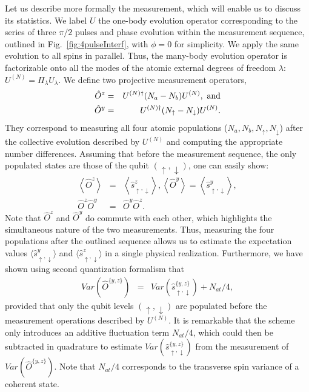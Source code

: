 Let us describe more formally the measurement, which will enable us to discuss its statistics. We label $U$ the one-body evolution operator corresponding to the series of three $\pi/2$ pulses and phase evolution within the measurement sequence, outlined in Fig.~\ref{fig:4pulseInterf}, with $\phi = 0$ for simplicity. 
We apply the same evolution to all spins in parallel. Thus, the many-body evolution operator is factorizable onto all the modes of the atomic external degrees of freedom $\lambda$: $U^{(N)} =  \Pi_{\lambda} U_{\lambda}$.
We define two projective measurement operators, 
\begin{eqnarray}
\hat{O}^z&=&U^{(N)\dagger} (N_a-N_b) U^{(N)}, ~\rm{and} \\
\hat{O}^y&=&U^{(N)\dagger} (N_\uparrow-N_\downarrow) U^{(N)}.
\end{eqnarray}
They correspond to measuring all four atomic populations ($N_a, N_b, N_\uparrow, N_\downarrow$) after the collective evolution described by $U^{(N)}$ and computing the appropriate number differences. Assuming that before the measurement sequence, the only populated states are those of the qubit $(\uparrow,\downarrow)$, one can easily show:
\begin{eqnarray}
    \left< \hat{O}^z \right> &=& \left< \hat{s}^z_{\uparrow,\downarrow} \right> , 
    \left< \hat{O}^y \right> = \left< \hat{s}^y_{\uparrow,\downarrow} \right> , \\
     \hat{O}^z \hat{O}^y &=& \hat{O}^y \hat{O}^z.
\end{eqnarray}
Note that $\hat{O}^z$ and $\hat{O}^y$ do commute with each other, which highlights the simultaneous nature of the two measurements. Thus, measuring the four populations after the outlined sequence allows us to estimate the expectation values $\langle \hat{s}^{y}_{\uparrow,\downarrow} \rangle$ and $\langle \hat{s}^{z}_{\uparrow,\downarrow} \rangle $ in a single physical realization. Furthermore, we have shown using second quantization formalism that
\begin{eqnarray}
Var(\hat{O}^{\{y,z\}}) &=& Var(\hat{s}^{\{y,z\}}_{\uparrow,\downarrow}) + N_{at}/4,
\end{eqnarray}
provided that only the qubit levels $(\uparrow,\downarrow)$ are populated before the measurement operations described by $U^{(N)}$. It is remarkable that the scheme only introduces an additive fluctuation term $N_{at}/4$, which could then be subtracted in quadrature to estimate $Var(\hat{s}^{\{y,z\}}_{\uparrow,\downarrow})$ from the measurement of $Var(\hat{O}^{\{y,z\}})$. Note that $N_{at}/4$ corresponds to the transverse spin variance of a coherent state.



